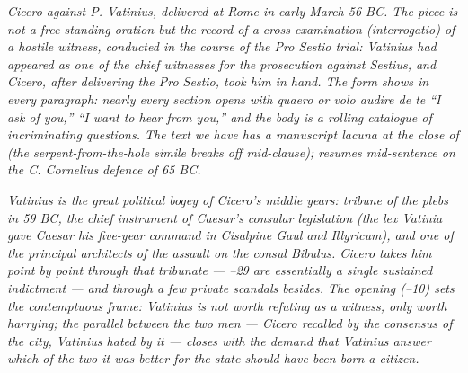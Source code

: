 
\textit{Cicero against P. Vatinius, delivered at Rome in early
March 56 BC. The piece is not a free-standing oration but the
record of a cross-examination (\textit{interrogatio}) of a
hostile witness, conducted in the course of the \textit{Pro
Sestio} trial: Vatinius had appeared as one of the chief
witnesses for the prosecution against Sestius, and Cicero, after
delivering the \textit{Pro Sestio}, took him in hand. The form
shows in every paragraph: nearly every section opens with
\textit{quaero} or \textit{volo audire de te} ``I ask of you,''
``I want to hear from you,'' and the body is a rolling
catalogue of incriminating questions. The text we have has a
manuscript lacuna at the close of  (the
serpent-from-the-hole simile breaks off mid-clause);  resumes mid-sentence on the C. Cornelius defence of 65 BC.}

\textit{Vatinius is the great political bogey of Cicero's middle
years: tribune of the plebs in 59 BC, the chief instrument of
Caesar's consular legislation (the lex Vatinia gave Caesar his
five-year command in Cisalpine Gaul and Illyricum), and one of
the principal architects of the assault on the consul Bibulus.
Cicero takes him point by point through that tribunate ---
\textsection{}--29 are essentially a single sustained
indictment --- and through a few private scandals besides. The
opening (\textsection{}--10) sets the contemptuous
frame: Vatinius is not worth refuting as a witness, only worth
harrying; the parallel between the two men --- Cicero recalled
by the consensus of the city, Vatinius hated by it --- closes
with the demand that Vatinius answer which of the two it was
better for the state should have been born a citizen.}

